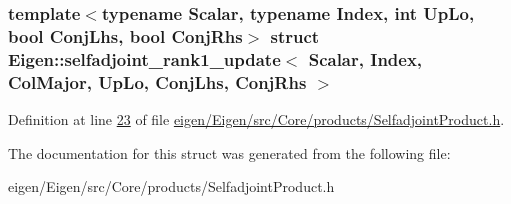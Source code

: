\subsubsection*{template$<$typename Scalar, typename Index, int Up\+Lo, bool Conj\+Lhs, bool Conj\+Rhs$>$\newline
struct Eigen\+::selfadjoint\+\_\+rank1\+\_\+update$<$ Scalar, Index, Col\+Major, Up\+Lo, Conj\+Lhs, Conj\+Rhs $>$}



Definition at line \hyperlink{eigen_2_eigen_2src_2_core_2products_2_selfadjoint_product_8h_source_l00023}{23} of file \hyperlink{eigen_2_eigen_2src_2_core_2products_2_selfadjoint_product_8h_source}{eigen/\+Eigen/src/\+Core/products/\+Selfadjoint\+Product.\+h}.



The documentation for this struct was generated from the following file\+:\begin{DoxyCompactItemize}
\item 
eigen/\+Eigen/src/\+Core/products/\+Selfadjoint\+Product.\+h\end{DoxyCompactItemize}

